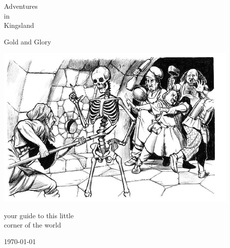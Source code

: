














\thispagestyle{empty}

\null          %
\vspace{1cm}   %

\begin{center}

\huge         Adventures  \\
                  in      \\
              Kingsland

\vspace{0.3\baselineskip}

\large      Gold and Glory

\vspace{2cm}

\includegraphics[width=120mm]{./fig/skeleton.jpg}

\vspace{2 cm}


\normalsize
         your guide to this little    \\
            corner of the world

\vfill

\today

\end{center}






